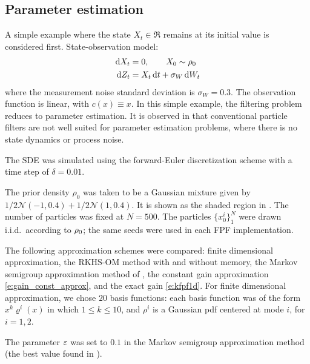 \subsection{Parameter estimation }
A simple example where the state $X_t \in \Re$ remains at its initial value is considered first.
State-observation model:
\[
\begin{aligned}
\,\textmd{d} X_t&=0, \qquad X_0 \sim \rho_0\\
\,\textmd{d} Z_t&= X_t \,\textmd{d} t+\sigma_{W}\,\textmd{d} W_t
\end{aligned}
\]
where the measurement noise standard deviation is $\sigma_{W} = 0.3$.  The observation function is linear, with $c(x)\equiv x$. 
In this simple example, the filtering problem reduces to parameter estimation. It is observed in \cite{AruMasGorCla02} that conventional particle filters are not well suited for parameter estimation problems, where there is no state dynamics or process noise.

The SDE was simulated using the forward-Euler discretization scheme with a time step of $\delta = 0.01$.

The prior density $\rho_0$
was
taken to be a Gaussian mixture given by $1/2 \mathscr{N}(-1,0.4) + 1/2 \mathscr{N}(1,0.4)$. It is shown as the shaded region in . The number of particles was fixed at $N = 500$. The particles $\{x^i_0\}_1^N$ were drawn i.i.d.\ according to $\rho_0$;  the same seeds were used in each FPF implementation.



The following approximation schemes were compared: finite dimensional approximation, the RKHS-OM method with and without memory, the Markov semigroup approximation method of \cite{tagmeh16a}, the constant gain approximation \eqref{e:gain_const_approx}, and the exact gain   \eqref{e:kfpf1d}.  For finite dimensional approximation, we chose $20$ basis functions:  each basis function was of the form $x^k \varrho^i(x)$ in which $1\le k\le 10$,  and $\rho^i$ is a Gaussian pdf centered at mode $i$, for $i=1,2$.   

The parameter $\varepsilon$ was set to $0.1$ in the Markov semigroup approximation method (the best value found in \cite{tagmeh16a}).



